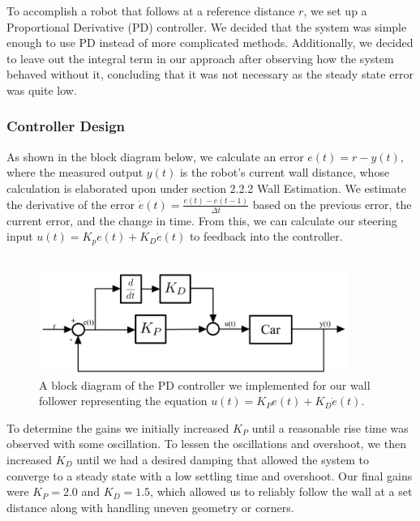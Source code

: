 \documentclass{article}
\begin{document}
To accomplish a robot that follows at a reference distance $r$, we set up a Proportional Derivative (PD) controller. We decided that the system was simple enough to use PD instead of more complicated methods. Additionally, we decided to leave out the integral term in our approach after observing how the system behaved without it, concluding that it was not necessary as the steady state error was quite low.\\ 

\subsubsection{Controller Design}
As shown in the block diagram below, we calculate an error $e(t) = r - y(t)$, where the measured output $y(t)$ is the robot's current wall distance, whose calculation is elaborated upon under section 2.2.2 Wall Estimation. We estimate the derivative of the error $\dot{e}(t) = \frac{e(t) - e(t-1)}{\Delta t}$ based on the previous error, the current error, and the change in time. From this, we can calculate our steering input $u(t) = K_pe(t) + K_D\dot{e}(t)$ to feedback into the controller.\\\\
\begin{figure}[!h]
\begin{center}
\includegraphics[width=0.9\textwidth]{block_diagram.png}
\caption{A block diagram of the PD controller we implemented for our wall follower representing the equation $u(t)=K_Pe(t)+K_D\dot{e}(t)$.}
\end{center}
\end{figure}

To determine the gains we initially increased $K_P$ until a reasonable rise time was observed with some oscillation. To lessen the oscillations and overshoot, we then increased $K_D$ until we had a desired damping that allowed the system to converge to a steady state with a low settling time and overshoot. Our final gains were $K_P = 2.0$ and $K_D = 1.5$, which allowed us to reliably follow the wall at a set distance along with handling uneven geometry or corners. \\ 
\end{document}
